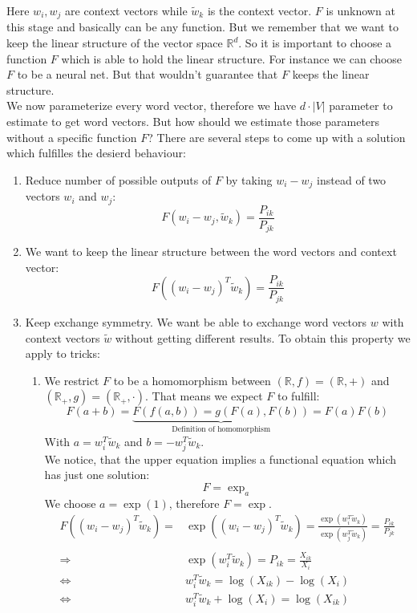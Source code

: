 Here $w_i, w_j$ are context vectors while $\tilde{w}_k$ is the context vector. 
$F$ is unknown at this stage and basically can be any function. But we remember
that we want to keep the linear structure of the vector space $\mathbb{R}^d$. So 
it is important to choose a function $F$ which is able to hold the linear 
structure. For instance we can choose $F$ to be a neural net. But that wouldn't 
guarantee that $F$ keeps the linear structure. \\

We now parameterize every word vector, therefore we have $d \cdot |V|$ 
parameter to estimate to get word vectors. But how should we estimate those parameters 
without a specific function $F$? There are several steps to come up with a solution
which fulfilles the desierd behaviour:

\begin{enumerate}
  \item 
    Reduce number of possible outputs of $F$ by taking $w_i - w_j$ instead of 
    two vectors $w_i$ and $w_j$:
    \[
    F(w_i - w_j, \tilde{w}_k) = \frac{P_{ik}}{P_{jk}}
    \]

  \item 
    We want to keep the linear structure between the word vectors and context
    vector:
    \[
    F\left((w_i - w_j)^T\tilde{w}_k\right) = \frac{P_{ik}}{P_{jk}}
    \]
   
  \item 
    Keep exchange symmetry. We want be able to exchange word vectors $w$ with
    context vectors $\tilde{w}$ without getting different results. To obtain
    this property we apply to tricks:
      \begin{enumerate}
        \item 
          We restrict $F$ to be a homomorphism between $(\mathbb{R}, f) = (\mathbb{R}, +)$ 
          and $(\mathbb{R}_+, g) = (\mathbb{R}_+, \cdot )$. That means we expect $F$
          to fulfill:
          \[
          F(a + b) = \underbrace{F(f(a, b)) = g(F(a), F(b))}_{\text{Definition of homomorphism}} =
            F(a)F(b)
          \]
          With $a = w_i^T\tilde{w}_k$ and $b = -w_j^T\tilde{w}_k$. \\
          We notice, that the upper equation implies a functional equation which has
          just one solution: 
          \[
          F = \exp_a
          \]  
          We choose $a = \exp(1)$, therefore $F = \exp$. 
          \begin{align*}
          F\left((w_i - w_j)^T\tilde{w}_k\right) = &\exp\left((w_i - w_j)^T\tilde{w}_k\right) =
            \frac{\exp(w_i^T\tilde{w}_k)}{\exp(w_j^T\tilde{w}_k)} = \frac{P_{ik}}{P_{jk}} \\ \\
          \Rightarrow\ &\exp(w_i^T\tilde{w}_k) = P_{ik} = \frac{X_{ik}}{X_i} \\
          \Leftrightarrow\ &w_i^T\tilde{w}_k = \log(X_{ik}) - \log(X_i) \\
          \Leftrightarrow\ &w_i^T\tilde{w}_k + \log(X_i) = \log(X_{ik})
          \end{align*}
   

\end{enumerate}
\end{enumerate}

